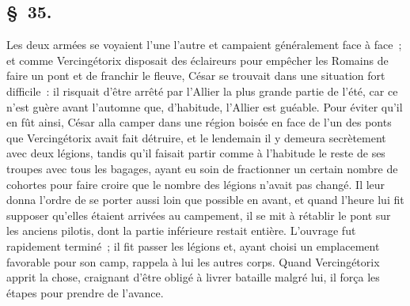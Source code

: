 \documentclass[french,twoside]{book} %
\begin{document}
\subsection[{§ 35.}]{ \textsc{§ 35.} }
\noindent Les deux armées se voyaient l’une l’autre et campaient généralement face à face ; et comme Vercingétorix disposait des éclaireurs pour empêcher les Romains de faire un pont et de franchir le fleuve, César se trouvait dans une situation fort difficile : il risquait d’être arrêté par l’Allier la plus grande partie de l’été, car ce n’est guère avant l’automne que, d’habitude, l’Allier est guéable. Pour éviter qu’il en fût ainsi, César alla camper dans une région boisée en face de l’un des ponts que Vercingétorix avait fait détruire, et le lendemain il y demeura secrètement avec deux légions, tandis qu’il faisait partir comme à l’habitude le reste de ses troupes avec tous les bagages, ayant eu soin de fractionner un certain nombre de cohortes pour faire croire que le nombre des légions n’avait pas changé. Il leur donna l’ordre de se porter aussi loin que possible en avant, et quand l’heure lui fit supposer qu’elles étaient arrivées au campement, il se mit à rétablir le pont sur les anciens pilotis, dont la partie inférieure restait entière. L'ouvrage fut rapidement terminé ; il fit passer les légions et, ayant choisi un emplacement favorable pour son camp, rappela à lui les autres corps. Quand Vercingétorix apprit la chose, craignant d’être obligé à livrer bataille malgré lui, il força les étapes pour prendre de l’avance.
\end{document}
